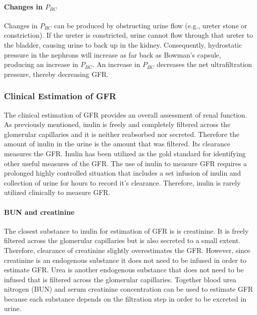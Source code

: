 \paragraph{Changes in $P_{BC}$}

Changes in $P_{BC}$ can be produced by obstructing urine flow (e.g., ureter stone or constriction). If the ureter is constricted, urine cannot flow through that ureter to the bladder, causing urine to back up in the kidney. Consequently, hydrostatic pressure in the nephrons will increase as far back as Bowman’s capsule, producing an increase in $P_{BC}$. An increase in $P_{BC}$ decreases the net ultrafiltration pressure, thereby decreasing GFR. 


\subsubsection{Clinical Estimation of GFR}

The clinical estimation of GFR provides an overall assessment of renal function. As previously mentioned, inulin is freely and completely filtered across the glomerular capillaries and it is neither reabsorbed nor secreted. Therefore the amount of inulin in the urine is the amount that was filtered. Its clearance measures the GFR. Inulin has been utilized as the gold standard for identifying other useful measures of the GFR. The use of inulin to measure GFR requires a prolonged highly controlled situation that includes a set infusion of inulin and collection of urine for hours to record it’s clearance. Therefore, inulin is rarely utilized clinically to measure GFR.

\paragraph{BUN and creatinine}

The closest substance to inulin for estimation of GFR is is creatinine. It is freely filtered across the glomerular capillaries but is also secreted to a small extent. Therefore, clearance of creatinine slightly overestimates the GFR. However, since creatinine is an endogenous substance it does not need to be infused in order to estimate GFR. Urea is another endogenous substance that does not need to be infused that is filtered across the glomerular capillaries. Together blood urea nitrogen (BUN) and serum creatinine concentration can be used to estimate GFR because each substance depends on the filtration step in order to be excreted in urine. 

